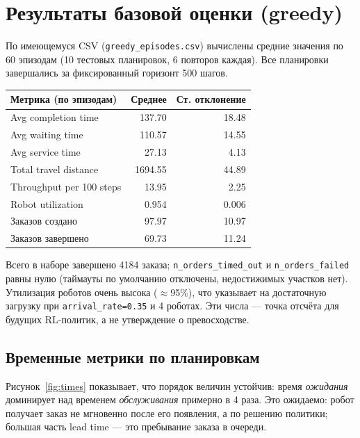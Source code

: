 \documentclass[11pt,a4paper]{article}
\newcommand{\code}[1]{\texttt{#1}}
\begin{document}
\section{Результаты базовой оценки (greedy)}
По имеющемуся CSV (\code{greedy\_episodes.csv}) вычислены средние значения по 60
эпизодам (10 тестовых планировок, 6 повторов каждая). Все планировки
завершались за фиксированный горизонт 500 шагов.

\begin{center}
\begin{tabular}{@{}lrr@{}}
\toprule
\textbf{Метрика (по эпизодам)} & \textbf{Среднее} & \textbf{Ст. отклонение} \\
\midrule
Avg completion time           & 137.70 & 18.48 \\
Avg waiting time              & 110.57 & 14.55 \\
Avg service time              & 27.13  & 4.13 \\
Total travel distance         & 1694.55 & 44.89 \\
Throughput per 100 steps      & 13.95  & 2.25 \\
Robot utilization             & 0.954  & 0.006 \\
Заказов создано               & 97.97  & 10.97 \\
Заказов завершено             & 69.73  & 11.24 \\
\bottomrule
\end{tabular}
\end{center}

Всего в наборе завершено 4184 заказа; \code{n\_orders\_timed\_out} и
\code{n\_orders\_failed} равны нулю (таймауты по умолчанию отключены,
недостижимых участков нет). Утилизация роботов очень высока ($\approx$95\%),
что указывает на достаточную загрузку при \code{arrival\_rate=0.35} и 4 роботах.
Эти числа — точка отсчёта для будущих RL-политик, а не утверждение о
превосходстве.

\subsection{Временные метрики по планировкам}
Рисунок~\ref{fig:times} показывает, что порядок величин устойчив: время
\emph{ожидания} доминирует над временем \emph{обслуживания} примерно в 4 раза.
Это ожидаемо: робот получает заказ не мгновенно после его появления, а по
решению политики; большая часть lead time — это пребывание заказа в очереди.
\end{document}
